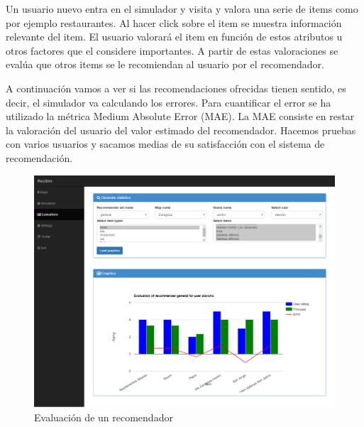 Un usuario nuevo entra en el simulador y visita y valora una serie de items como por ejemplo restaurantes. Al hacer click sobre el item se muestra información relevante del item. El usuario valorará el item en función de estos atributos u otros factores que el considere importantes. A partir de estas valoraciones se evalúa que otros items se le recomiendan al usuario por el recomendador. 

A continuación vamos a ver si las recomendaciones ofrecidas tienen sentido, es decir, el simulador va calculando los errores. Para cuantificar el error se ha utilizado la métrica Medium Absolute Error (MAE). La MAE consiste en restar la valoración del usuario del valor estimado del recomendador. Hacemos pruebas con varios usuarios y sacamos medias de su satisfacción con el sistema de recomendación.

\newpage

\begin{figure}[H]
	\centering\includegraphics[scale=0.35]{imagenes/capitulo12/evaluacion.png}
	\caption{Evaluación de un recomendador}
	\label{evaluacionRecomendador}
\end{figure}